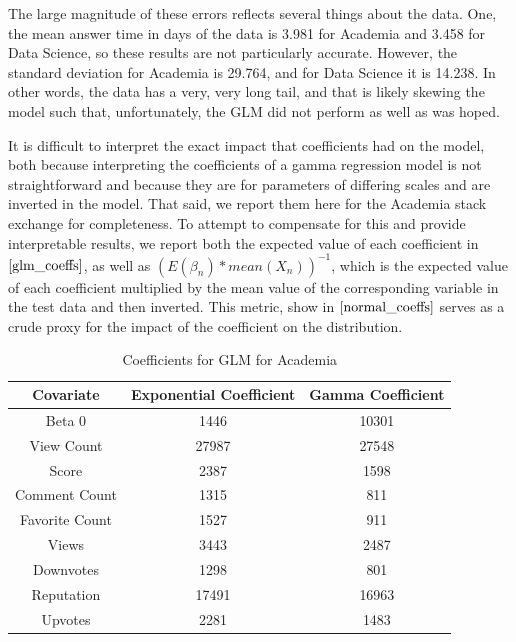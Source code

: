 \documentclass[12pt]{article}
\begin{document}
The large magnitude of these errors reflects several things about the data. One, the mean answer time in days of the data is 3.981 for Academia and 3.458 for Data Science, so these results are not particularly accurate. However, the standard deviation for Academia is 29.764, and for Data Science it is 14.238. In other words, the data has a very, very long tail, and that is likely skewing the model such that, unfortunately, the GLM did not perform as well as was hoped.

It is difficult to interpret the exact impact that coefficients had on the model, both because interpreting the coefficients of a gamma regression model is not straightforward and because they are for parameters of differing scales and are inverted in the model. That said, we report them here for the Academia stack exchange for completeness. To attempt to compensate for this and provide interpretable results, we report both the expected value of each coefficient in $\ref{glm_coeffs}$, as well as $(E(\beta_n)*mean(X_n))^{-1}$, which is the expected value of each coefficient multiplied by the mean value of the corresponding variable in the test data and then inverted. This metric, show in $\ref{normal_coeffs}$ serves as a crude proxy for the impact of the coefficient on the distribution. 

\begin{table}[ht]
  \centering
  \begin{tabular}{|c|c|c|}\hline
    Covariate & Exponential Coefficient & Gamma Coefficient \\ \hline
    Beta 0 & 1446 & 10301\\
    View Count & 27987 & 27548 \\
    Score & 2387 & 1598 \\
    Comment Count & 1315 & 811 \\
    Favorite Count & 1527 & 911 \\
    Views & 3443 & 2487 \\
    Downvotes & 1298 & 801 \\
    Reputation & 17491 & 16963 \\
    Upvotes & 2281 & 1483 \\ \hline
  \end{tabular}
  \caption{Coefficients for GLM for Academia}
  \label{glm_coeffs}
\end{table}
\end{document}
